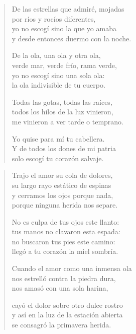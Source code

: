 \documentclass[12pt]{article}
\begin{document}
\clearpage
{}
\begin{verse}

De las estrellas que admiré, mojadas\\
por ríos y rocíos diferentes,\\
yo no escogí sino la que yo amaba\\
y desde entonces duermo con la noche.  

De la ola, una ola y otra ola,\\
verde mar, verde frío, rama verde,\\
yo no escogí sino una sola ola:\\
la ola indivisible de tu cuerpo.  

Todas las gotas, todas las raíces,\\
todos los hilos de la luz vinieron,\\
me vinieron a ver tarde o temprano.  

Yo quise para mí tu cabellera.\\
Y de todos los dones de mi patria\\
solo escogí tu corazón salvaje.  

\end{verse}

\clearpage
{}
\begin{verse}

Trajo el amor su cola de dolores,\\
su largo rayo estático de espinas\\
y cerramos los ojos porque nada,\\
porque ninguna herida nos separe.  

No es culpa de tus ojos este llanto:\\
tus manos no clavaron esta espada:\\
no buscaron tus pies este camino:\\
llegó a tu corazón la miel sombría.  

Cuando el amor como una inmensa ola\\
nos estrelló contra la piedra dura,\\
nos amasó con una sola harina,  

cayó el dolor sobre otro dulce rostro\\
y así en la luz de la estación abierta\\
se consagró la primavera herida.  

\end{verse}
\end{document}
